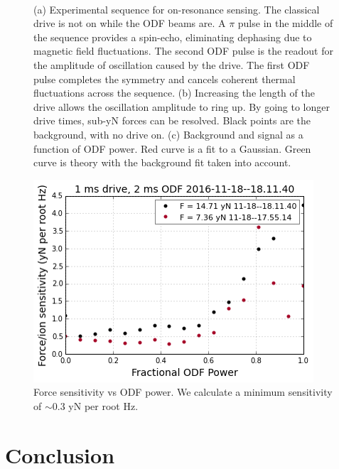 \documentclass[aps,prl,twocolumn,groupedaddress]{revtex4-1}
\begin{document}
\begin{figure}
  \\
  \hfill
  \caption{(a) Experimental sequence for on-resonance sensing. The classical drive is not on while the ODF beams are. A $\pi$ pulse in the middle of the sequence provides a spin-echo, eliminating dephasing due to magnetic field fluctuations. The second ODF pulse is the readout for the amplitude of oscillation caused by the drive. The first ODF pulse completes the symmetry and cancels coherent thermal fluctuations across the sequence. (b) Increasing the length of the drive allows the oscillation amplitude to ring up. By going to longer drive times, sub-yN forces can be resolved. Black points are the background, with no drive on. (c) Background and signal as a function of ODF power. Red curve is a fit to a Gaussian. Green curve is theory with the background fit taken into account.}\label{fig:4}
\end{figure}

\begin{figure}
\includegraphics[width=.25\textwidth]{force_sens}
\caption{Force sensitivity vs ODF power. We calculate a minimum sensitivity of $\sim$0.3 yN per root Hz.}\label{Fig 5}
\end{figure}

\section{Conclusion}
\end{document}
